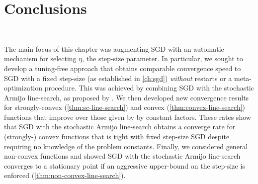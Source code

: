 \section{Conclusions}~\label{sec:line-search-conclusions}

The main focus of this chapter was augmenting \ac{SGD} with an automatic mechanism for selecting \( \eta \), the step-size parameter. 
In particular, we sought to develop a tuning-free approach that obtains comparable convergence speed to \ac{SGD} with a fixed step-size (as established in \autoref{ch:sgd}) \emph{without} restarts or a meta-optimization procedure. 
This was achieved by combining \ac{SGD} with the stochastic Armijo line-search, as proposed by \citet{vaswani2019painless}. 
We then developed new convergence results for strongly-convex (\autoref{thm:sc-line-search}) and convex (\autoref{thm:convex-line-search}) functions that improve over those given by \citet{vaswani2019painless} by constant factors. 
These rates show that \ac{SGD} with the stochastic Armijo line-search obtains a converge rate for (strongly-) convex functions that is tight with fixed step-size \ac{SGD} despite requiring no knowledge of the problem constants. 
Finally, we considered general non-convex functions and showed \ac{SGD} with the stochastic Armijo line-search converges to a stationary point if an aggressive upper-bound on the step-size is enforced (\autoref{thm:non-convex-line-search}). 




